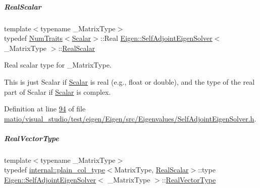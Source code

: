 \mbox{\label{group___eigenvalues___module_a5dae5f422a3c71060e6bd31332bf64fd}} 
\subparagraph{\texorpdfstring{Real\+Scalar}{RealScalar}\hspace{0.1cm}{\footnotesize\ttfamily [2/2]}}
{\footnotesize\ttfamily template$<$typename \+\_\+\+Matrix\+Type$>$ \\
typedef \hyperlink{group___core___module_struct_eigen_1_1_num_traits}{Num\+Traits}$<$\hyperlink{group___eigenvalues___module_a0bfcedf4245b6846007ca4f01e4feb1f}{Scalar}$>$\+::Real \hyperlink{group___eigenvalues___module_class_eigen_1_1_self_adjoint_eigen_solver}{Eigen\+::\+Self\+Adjoint\+Eigen\+Solver}$<$ \+\_\+\+Matrix\+Type $>$\+::\hyperlink{group___eigenvalues___module_a5dae5f422a3c71060e6bd31332bf64fd}{Real\+Scalar}}



Real scalar type for {\ttfamily \+\_\+\+Matrix\+Type}. 

This is just {\ttfamily Scalar} if \hyperlink{group___eigenvalues___module_a0bfcedf4245b6846007ca4f01e4feb1f}{Scalar} is real (e.\+g., {\ttfamily float} or {\ttfamily double}), and the type of the real part of {\ttfamily Scalar} if \hyperlink{group___eigenvalues___module_a0bfcedf4245b6846007ca4f01e4feb1f}{Scalar} is complex. 

Definition at line \hyperlink{matio_2visual__studio_2test_2eigen_2_eigen_2src_2_eigenvalues_2_self_adjoint_eigen_solver_8h_source_l00094}{94} of file \hyperlink{matio_2visual__studio_2test_2eigen_2_eigen_2src_2_eigenvalues_2_self_adjoint_eigen_solver_8h_source}{matio/visual\+\_\+studio/test/eigen/\+Eigen/src/\+Eigenvalues/\+Self\+Adjoint\+Eigen\+Solver.\+h}.

\mbox{\label{group___eigenvalues___module_acd090d5fdfc3cc017a13b6d8daa92287}} 
\subparagraph{\texorpdfstring{Real\+Vector\+Type}{RealVectorType}\hspace{0.1cm}{\footnotesize\ttfamily [1/2]}}
{\footnotesize\ttfamily template$<$typename \+\_\+\+Matrix\+Type$>$ \\
typedef \hyperlink{struct_eigen_1_1internal_1_1plain__col__type}{internal\+::plain\+\_\+col\+\_\+type}$<$Matrix\+Type, \hyperlink{group___eigenvalues___module_a5dae5f422a3c71060e6bd31332bf64fd}{Real\+Scalar}$>$\+::type \hyperlink{group___eigenvalues___module_class_eigen_1_1_self_adjoint_eigen_solver}{Eigen\+::\+Self\+Adjoint\+Eigen\+Solver}$<$ \+\_\+\+Matrix\+Type $>$\+::\hyperlink{group___eigenvalues___module_acd090d5fdfc3cc017a13b6d8daa92287}{Real\+Vector\+Type}}



